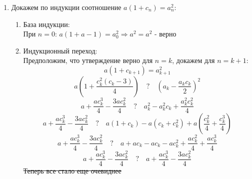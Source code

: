 \documentclass{report}
\begin{document}
\begin{enumerate}
    \item Докажем по индукции соотношение $a(1+c_n) = a_n^2$:
    \begin{enumerate}
        \item База индукции:\\
        При $n = 0$: $a(1+a-1)=a^2_0 \Rightarrow a^2=a^2$ - верно
        \item Индукционный переход:\\
        Предположим, что утверждение верно для $n = k$, докажем для $n = k+1$:
        \begin{equation*}
            a(1 + c_{k+1}) = a_{k+1}^2
        \end{equation*}
        \begin{equation*}
            a\left(1 + \frac{c_k^2(c_k - 3)}{4}\right) \quad?\quad \left(a_k - \frac{a_kc_k}{2}\right)^2
        \end{equation*}
        \begin{equation*}
            a + \frac{a c_k^3}{4} - \frac{3ac_k^2}{4} \quad?\quad a_k^2 - a_k^2c_k + \frac{a_k^2c_k^2}{4}
        \end{equation*}
        \begin{equation*}
            a + \frac{a c_k^3}{4} - \frac{3ac_k^2}{4} \quad?\quad a(1 + c_k) - a(c_k + c_k^2) + a\left(\frac{c_k^2}{4} + \frac{c_k^3}{4}\right)
        \end{equation*}
        \begin{equation*}
            a + \frac{a c_k^3}{4} - \frac{3ac_k^2}{4} \quad?\quad a + ac_k - ac_k - ac_k^2 + \frac{ac_k^2}{4} + \frac{ac_k^3}{4}
        \end{equation*}
        \begin{equation*}
            a + \frac{a c_k^3}{4} - \frac{3ac_k^2}{4} \quad?\quad a + \frac{a c_k^3}{4} - \frac{3ac_k^2}{4}
        \end{equation*}
	\sout{Теперь все стало еще очевиднее}
    \end{enumerate}


\end{enumerate}
\end{document}
